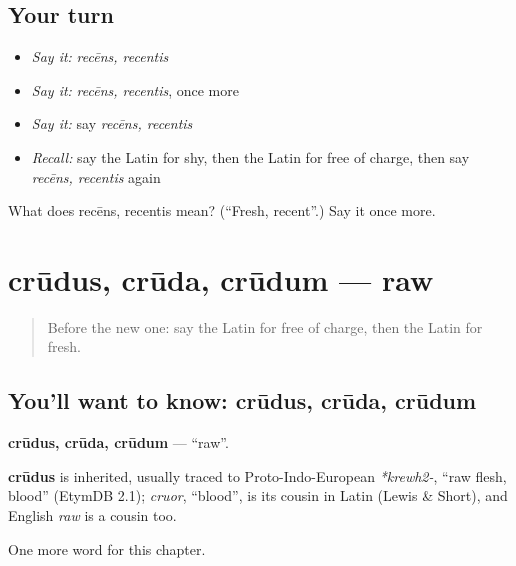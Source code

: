 \subsection*{Your turn}
\begin{itemize}
\raggedright
  \item \emph{Say it:} \emph{recēns, recentis}
  \item \emph{Say it:} \emph{recēns, recentis}, once more
  \item \emph{Say it:} say \emph{recēns, recentis}
  \item \emph{Recall:} say the Latin for shy, then the Latin for free of charge, then say \emph{recēns, recentis} again
\end{itemize}

\begin{tcolorbox}[breakable,colback=teal!4,colframe=teal!35!black,title={Before you move on}]
What does recēns, recentis mean? (\textquotedblleft{}Fresh, recent\textquotedblright{}.) Say it once more.
\end{tcolorbox}
\section[crūdus, crūda, crūdum]{crūdus, crūda, crūdum — raw}

\label{lesson:LA-C181-crudus}



\begin{quote}
Before the new one: say the Latin for free of charge, then the Latin for fresh.
\end{quote}

\subsection*{You'll want to know: crūdus, crūda, crūdum}
\textbf{crūdus, crūda, crūdum} — \textquotedblleft{}raw\textquotedblright{}.

\begin{cousinweb}
\textbf{crūdus} is inherited, usually traced to Proto-Indo-European \emph{*krewh2-}, \textquotedblleft{}raw flesh, blood\textquotedblright{} (EtymDB 2.1); \emph{cruor}, \textquotedblleft{}blood\textquotedblright{}, is its cousin in Latin (Lewis \& Short), and English \emph{raw} is a cousin too.
\end{cousinweb}

\begin{grammarlens}[title={What you've built}]
One more word for this chapter.
\end{grammarlens}

